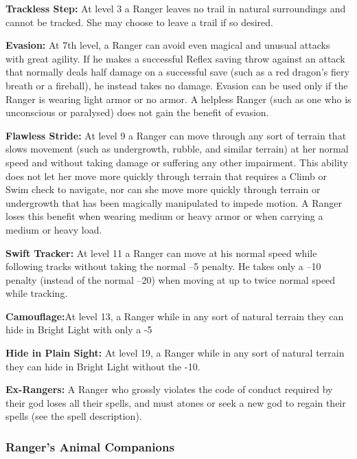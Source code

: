 \textbf{Trackless Step:} At level 3 a Ranger leaves no trail in natural surroundings and cannot be tracked. She may choose to leave a trail if so desired.

\textbf{Evasion:} At 7th level, a Ranger can avoid even magical and unusual attacks with great agility. If he makes a successful Reflex saving throw against an attack that normally deals half damage on a successful save (such as a red dragon’s fiery breath or a fireball), he instead takes no damage. Evasion can be used only if the Ranger is wearing light armor or no armor. A helpless Ranger (such as one who is unconscious or paralysed) does not gain the benefit of evasion.

\textbf{Flawless Stride:} At level 9 a Ranger can move through any sort of terrain that slows movement (such as undergrowth, rubble, and similar terrain) at her normal speed and without taking damage or suffering any other impairment.
This ability does not let her move more quickly through terrain that requires a Climb or Swim check to navigate, nor can she move more quickly through terrain or undergrowth that has been magically manipulated to impede motion.
A Ranger loses this benefit when wearing medium or heavy armor or when carrying a medium or heavy load.

\textbf{Swift Tracker:} At level 11 a Ranger can move at his normal speed while following tracks without taking the normal –5 penalty. He takes only a –10 penalty (instead of the normal –20) when moving at up to twice normal speed while tracking.

\textbf{Camouflage:}At level 13, a Ranger while in any sort of natural terrain they can hide in Bright Light with only a -5

\textbf{Hide in Plain Sight:} At level 19, a Ranger while in any sort of natural terrain they can hide in Bright Light without the -10.

\textbf{Ex-Rangers:} A Ranger who grossly violates the code of conduct required by their god loses all their spells, and must atones or seek a new god to regain their spells (see the  spell description).

\subsubsection{Ranger's Animal Companions}

